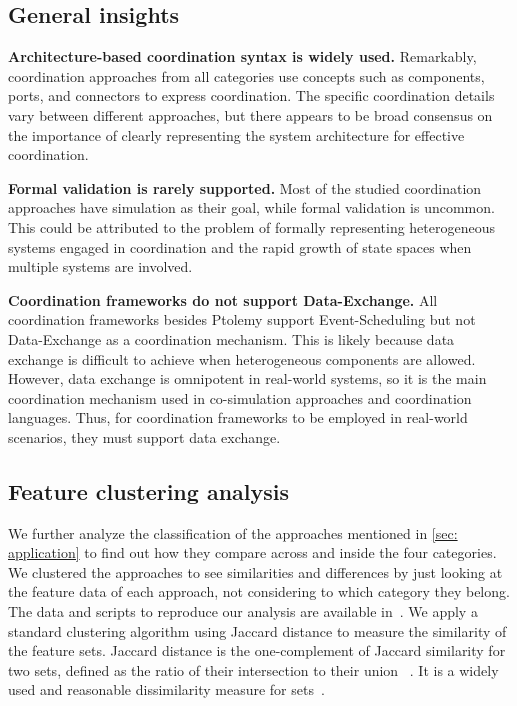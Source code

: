 \documentclass[runningheads]{llncs}
\begin{document}
\subsection{General insights}

\textbf{Architecture-based coordination syntax is widely used.}
Remarkably, coordination approaches from all categories use concepts such as components, ports, and connectors to express coordination.
The specific coordination details vary between different approaches, but there appears to be broad consensus on the importance of clearly representing the system architecture for effective coordination.

\textbf{Formal validation is rarely supported.}
Most of the studied coordination approaches have simulation as their goal, while formal validation is uncommon.
This could be attributed to the problem of formally representing heterogeneous systems engaged in coordination and the rapid growth of state spaces when multiple systems are involved.

\textbf{Coordination frameworks do not support Data-Exchange.}
All coordination frameworks besides Ptolemy support \textsf{Event-Scheduling} but not \textsf{Data-Exchange} as a coordination mechanism.
This is likely because data exchange is difficult to achieve when heterogeneous components are allowed.
However, data exchange is omnipotent in real-world systems, so it is the main coordination mechanism used in co-simulation approaches and coordination languages.
Thus, for coordination frameworks to be employed in real-world scenarios, they must support data exchange.

\subsection{Feature clustering analysis}

We further analyze the classification of the approaches mentioned in \autoref{sec: application} to find out how they compare across and inside the four categories.
We clustered the approaches to see similarities and differences by just looking at the feature data of each approach, not considering to which category they belong.
The data and scripts to reproduce our analysis are available in~\cite{timkrauterArtifactsCoordination2024}.
We apply a standard clustering algorithm using Jaccard distance to measure the similarity of the feature sets.
Jaccard distance is the one-complement of Jaccard similarity for two sets, defined as the ratio of their intersection to their union ~\cite{levandowskyDistanceSets1971}.
It is a widely used and reasonable dissimilarity measure for sets~\cite{levandowskyDistanceSets1971}.
\end{document}
